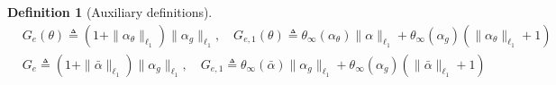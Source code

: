 \documentclass{article}
\newtheorem{definition}[theorem]{Definition}
\begin{document}
\begin{definition}[Auxiliary definitions]
\begin{align*}
       & G_e(\theta) \triangleq (1+\|\alpha_{\theta}\|_{\ell_1})\|\alpha_g\|_{\ell_1}, \quad   G_{e,1}(\theta) \triangleq \theta_{\infty}(\alpha_{\theta})\|\alpha\|_{\ell_1}+\theta_{\infty}(\alpha_g)(\|\alpha_{\theta}\|_{\ell_1}+1) \\
        & G_e \triangleq (1+\|\bar{\alpha}\|_{\ell_1})\|\alpha_g\|_{\ell_1}, \quad 
        G_{e,1} \triangleq \theta_{\infty}(\bar{\alpha})\|\alpha_g\|_{\ell_1}+\theta_{\infty}(\alpha_g)(\|\bar{\alpha}\|_{\ell_1}+1)
   \end{align*}
\end{definition}
\end{document}
